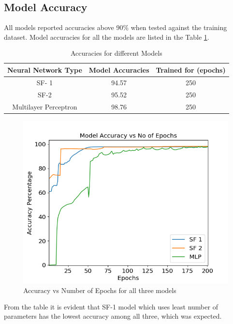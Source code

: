 \documentclass[12pt]{article}
\theoremstyle{definition}
\begin{document}
		\subsection{Model Accuracy}
		All models reported accuracies above 90\% when tested against the training dataset. Model accuracies for all the models are listed in the Table \ref{result:model-accu}.
		\begin{table}[!h]
			\centering
			\caption{Accuracies for different Models}
			\label{result:model-accu}
			\begin{tabular}{|c|c|c|}
				\hline
				\textbf{Neural Network Type}      & \textbf{Model Accuracies} & \textbf{Trained for (epochs)} \\ \hline
				SF- 1                 & 94.57                     & 250                  \\ \hline
				SF-2                  & 95.52                     & 250                  \\ \hline
				Multilayer Perceptron & 98.76                     & 250                  \\ \hline
			\end{tabular}
		\end{table}
		\begin{figure}[!h]
			\centering
			\includegraphics[width=400pt]{pictures/all_accuracy.png}
			\caption{Accuracy vs Number of Epochs for all three models}
			\label{fig:sf12-accu}
		\end{figure}
		
		From the table it is evident that SF-1 model which uses least number of parameters has the lowest accuracy among all three, which was expected.
		
\end{document}
